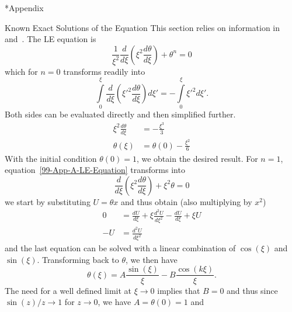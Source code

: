 \begin{appendix}
\renewcommand{\thesection}{\Alph{section}}
\renewcommand{\thesubsection}{\Alph{subsection}}
\renewcommand\thetheorem{\thesubsection.\arabic{theorem}}

\begin{section}*{Appendix}
%
%
\begin{subsection}{Known Exact Solutions of the \texorpdfstring{}{LE} Equation}
\label{99-App-A-Exact-LE-Solutions}
This section relies on information in~\cite{weissteinLaneEmdenDifferentialEquation2020} and~\cite{chandrasekharChandrasekharAnIntroductionStudy1958}.
The \ac{LE} equation is
\begin{equation}
	\frac{1}{\xi^2}\frac{d}{d\xi}\left(\xi^2\frac{d\theta}{d\xi}\right)+\theta^n=0
	\label{99-App-A-LE-Equation}
\end{equation}
which for $n=0$ transforms readily into
\begin{equation}
	\int\limits_0^\xi\frac{d}{d\xi}\left(\xi'^2\frac{d\theta}{d\xi}\right)d\xi' = -\int\limits_0^\xi\xi'^2d\xi'.
\end{equation}
Both sides can be evaluated directly and then simplified further.
\begin{align}
	\xi^2\frac{d\theta}{d\xi} &= -\frac{\xi^3}{3}\\
	\theta(\xi) &= \theta(0)-\frac{\xi^2}{6}
\end{align}
With the initial condition $\theta(0)=1$, we obtain the desired result. For $n=1$, equation~\ref{99-App-A-LE-Equation} transforms into
\begin{equation}
	\frac{d}{d\xi}\left(\xi^2\frac{d\theta}{d\xi}\right)+\xi^2\theta=0
\end{equation}
we start by substituting $U=\theta x$ and thus obtain (also multiplying by $x^2$)
\begin{align}
	0 &= \frac{dU}{d\xi} + \xi\frac{d^2U}{d\xi^2} - \frac{dU}{d\xi} + \xi U\\
	-U &= \frac{d^2U}{d\xi^2}
\end{align}
and the last equation can be solved with a linear combination of $\cos(\xi)$ and $\sin(\xi)$.
Transforming back to $\theta$, we then have
\begin{equation}
	\theta(\xi) = A\frac{\sin(\xi)}{\xi} - B\frac{\cos(k\xi)}{\xi}.
\end{equation}
The need for a well defined limit at $\xi\rightarrow0$ implies that $B=0$ and thus since $\sin(z)/z\rightarrow1$ for $z\rightarrow0$, we have $A=\theta(0)=1$ and 

\end{subsection}
\end{section}
\end{appendix}
